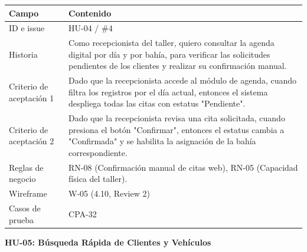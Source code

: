 {\def\LTcaptype{none} %
\begin{longtable}[]{@{}
  >{\raggedright\arraybackslash}p{}
  >{\raggedright\arraybackslash}p{}@{}}
\toprule\noalign{}
\begin{minipage}[b]{\linewidth}\raggedright
\textbf{Campo}
\end{minipage} & \begin{minipage}[b]{\linewidth}\raggedright
\textbf{Contenido}
\end{minipage} \\
\midrule\noalign{}
\endhead
\bottomrule\noalign{}
\endlastfoot
ID e issue & HU-04 / \#4 \\
Historia & Como recepcionista del taller, quiero consultar la agenda
digital por día y por bahía, para verificar las solicitudes pendientes
de los clientes y realizar su confirmación manual. \\
Criterio de aceptación 1 & Dado que la recepcionista accede al módulo de
agenda, cuando filtra los registros por el día actual, entonces el
sistema despliega todas las citas con estatus "Pendiente". \\
Criterio de aceptación 2 & Dado que la recepcionista revisa una cita
solicitada, cuando presiona el botón "Confirmar", entonces el estatus
cambia a "Confirmada" y se habilita la asignación de la bahía
correspondiente. \\
Reglas de negocio & RN-08 (Confirmación manual de citas web), RN-05
(Capacidad física del taller). \\
Wireframe & W-05 (4.10, Review 2) \\
Casos de prueba & CPA-32 \\
\end{longtable}
}

\textbf{HU-05: Búsqueda Rápida de Clientes y Vehículos}

